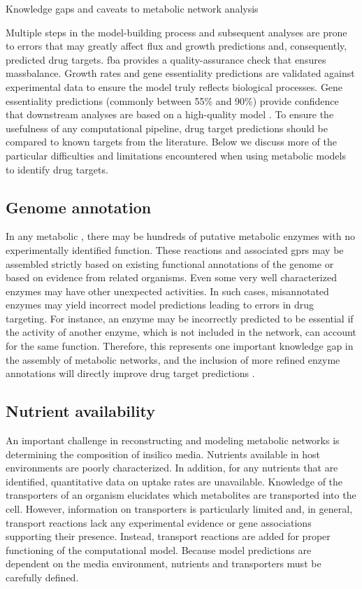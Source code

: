 \begin{pabox}[label=trends:box:caveats,float*=h!,width=\textwidth]{Knowledge gaps and caveats to metabolic network analysis}
\small
\begin{multicols}{2}
Multiple steps in the model-building process and subsequent 
analyses are prone to errors that may greatly affect \gls{flux} 
and growth predictions and, consequently, predicted drug 
targets. \gls{fba} provides a quality-assurance check that ensures 
\gls{massbalance}. Growth rates and gene essentiality predictions 
are validated against experimental data to ensure the 
model truly reflects biological processes. Gene essentiality 
predictions (commonly between 55\% and 90\%) provide 
confidence that downstream analyses are based on a 
high-quality model \cite{Feist:2007dq,Jamshidi:2007ei}. To ensure the usefulness of 
any computational pipeline, drug target predictions 
should be compared to known targets from the literature. 
Below we discuss more of the particular difficulties and 
limitations encountered when using metabolic models to 
identify drug targets.

\subsection*{Genome annotation}
In any metabolic , there may be 
hundreds of putative metabolic enzymes with no 
experimentally identified function. These reactions 
and associated \glspl{gpr} may be assembled 
strictly based on existing functional annotations 
of the genome or based on evidence from related 
organisms. Even some very well characterized enzymes 
may have other unexpected activities. In such cases, 
misannotated enzymes may yield incorrect model 
predictions leading to errors in drug targeting. For 
instance, an enzyme may be incorrectly predicted to be 
essential if the activity of another enzyme, which is 
not included in the network, can account for the same function. 
Therefore, this represents one important knowledge gap in 
the assembly of metabolic networks, and the inclusion of 
more refined enzyme annotations will directly improve 
drug target predictions \cite{Hsiao:2010bu,Szappanos:2011gu}.

\subsection*{Nutrient availability}
An important challenge in reconstructing and modeling 
metabolic networks is determining the composition of 
\gls{insilico} media. Nutrients available in host environments 
are poorly characterized. In addition, for any nutrients 
that are identified, quantitative data on uptake rates 
are unavailable. Knowledge of the transporters of an 
organism elucidates which metabolites are transported 
into the cell. However, information on transporters 
is particularly limited and, in general, transport 
reactions lack any experimental evidence or gene 
associations supporting their presence. Instead, 
transport reactions are added for proper functioning 
of the computational model. Because model predictions are 
dependent on the media environment, nutrients and 
transporters must be carefully defined.


\end{multicols}
\end{pabox}
